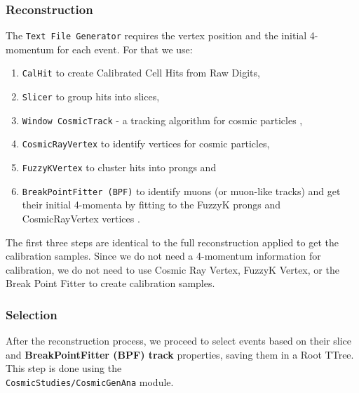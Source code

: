 \subsubsection*{Reconstruction}
The \texttt{Text File Generator} requires the vertex position and the initial 4-momentum for each event. For that we use:
\begin{enumerate}
\item \texttt{CalHit} to create Calibrated Cell Hits from Raw Digits,
\item \texttt{Slicer} to group hits into slices,
\item \texttt{Window CosmicTrack} - a tracking algorithm for cosmic particles \cite{NOVA-doc-15977-v1},
\item \texttt{CosmicRayVertex} to identify vertices for cosmic particles,
\item \texttt{FuzzyKVertex} to cluster hits into prongs and
\item \texttt{BreakPointFitter (BPF)} to identify muons (or muon-like tracks) and get their initial 4-momenta by fitting to the FuzzyK prongs and CosmicRayVertex vertices \cite{NOVA-doc-32455-v1}.
\end{enumerate}
The first three steps are identical to the full reconstruction applied to get the calibration samples. Since we do not need a 4-momentum information for calibration, we do not need to use Cosmic Ray Vertex, FuzzyK Vertex, or the Break Point Fitter to create calibration samples.

\subsubsection*{Selection}\label{secSelection}
After the reconstruction process, we proceed to select events based on their slice and \textbf{BreakPointFitter (BPF) track} properties, saving them in a Root TTree. This step is done using the\\ \texttt{CosmicStudies/CosmicGenAna} module.

